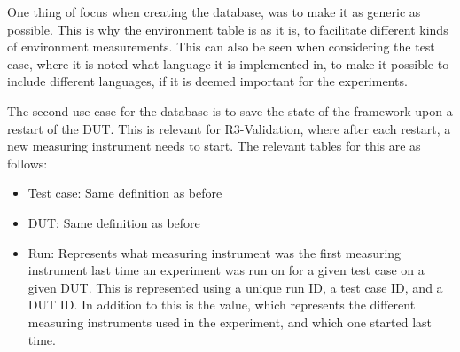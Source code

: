 One thing of focus when creating the database, was to make it as generic as possible. This is why the environment table is as it is, to facilitate different kinds of environment measurements. This can also be seen when considering the test case, where it is noted what language it is implemented in, to make it possible to include different languages, if it is deemed important for the experiments.\newline


The second use case for the database is to save the state of the framework upon a restart of the DUT. This is relevant for R3-Validation, where after each restart, a new measuring instrument needs to start. The relevant tables for this are as follows:

\begin{itemize}
    \item Test case: Same definition as before
    \item DUT: Same definition as before
    \item Run: Represents what measuring instrument was the first measuring instrument last time an experiment was run on for a given test case on a given DUT. This is represented using a unique run ID, a test case ID, and a DUT ID. In addition to this is the value, which represents the different measuring instruments used in the experiment, and which one started last time.
\end{itemize}

